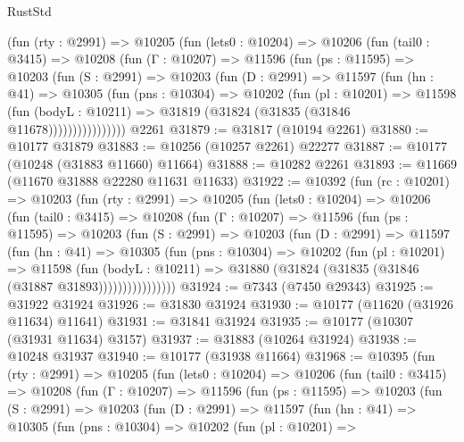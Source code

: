 \begin{lexlean}{RustStd}
\begin{coremodule}
        (fun (rty : @2991) =>
        @10205
          (fun (lets0 : @10204) =>
          @10206
            (fun (tail0 : @3415) =>
            @10208
              (fun (Γ : @10207) =>
              @11596
                (fun (ps : @11595) =>
                @10203
                  (fun (S : @2991) =>
                  @10203
                    (fun (D : @2991) =>
                    @11597
                      (fun (hn : @41) =>
                      @10305
                        (fun (pns : @10304) =>
                        @10202
                          (fun (pl : @10201) =>
                          @11598
                            (fun (bodyL : @10211) =>
                            @31819 (@31824 (@31835 (@31846 @11678))))))))))))))))
    @2261
@31879 := @31817 (@10194 @2261)
@31880 := @10177 @31879
@31883 := @10256 (@10257 @2261) @22277
@31887 := @10177 (@10248 (@31883 @11660) @11664)
@31888 := @10282 @2261
@31893 := @11669 (@11670 @31888 @22280 @11631 @11633)
@31922 := @10392
    (fun (rc : @10201) =>
    @10203
      (fun (rty : @2991) =>
      @10205
        (fun (lets0 : @10204) =>
        @10206
          (fun (tail0 : @3415) =>
          @10208
            (fun (Γ : @10207) =>
            @11596
              (fun (ps : @11595) =>
              @10203
                (fun (S : @2991) =>
                @10203
                  (fun (D : @2991) =>
                  @11597
                    (fun (hn : @41) =>
                    @10305
                      (fun (pns : @10304) =>
                      @10202
                        (fun (pl : @10201) =>
                        @11598
                          (fun (bodyL : @10211) =>
                          @31880 (@31824 (@31835 (@31846 (@31887 @31893))))))))))))))))
@31924 := @7343 (@7450 @29343)
@31925 := @31922 @31924
@31926 := @31830 @31924
@31930 := @10177 (@11620 (@31926 @11634) @11641)
@31931 := @31841 @31924
@31935 := @10177 (@10307 (@31931 @11634) @3157)
@31937 := @31883 (@10264 @31924)
@31938 := @10248 @31937
@31940 := @10177 (@31938 @11664)
@31968 := @10395
    (fun (rty : @2991) =>
    @10205
      (fun (lets0 : @10204) =>
      @10206
        (fun (tail0 : @3415) =>
        @10208
          (fun (Γ : @10207) =>
          @11596
            (fun (ps : @11595) =>
            @10203
              (fun (S : @2991) =>
              @10203
                (fun (D : @2991) =>
                @11597
                  (fun (hn : @41) =>
                  @10305
                    (fun (pns : @10304) =>
                    @10202
                      (fun (pl : @10201) =>

\end{coremodule}
\end{lexlean}
